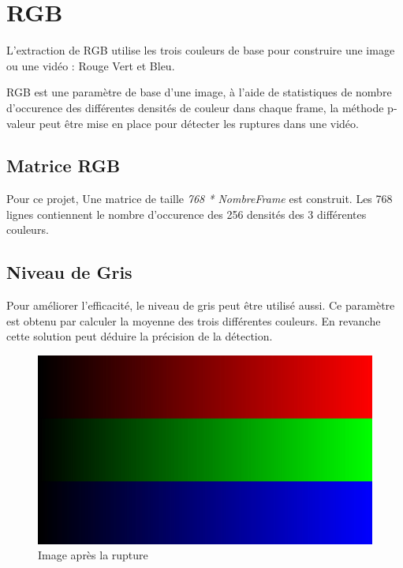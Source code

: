 \section{RGB}
L’extraction de RGB utilise les trois couleurs de base pour construire une image ou une vidéo : Rouge Vert et Bleu.

RGB est une paramètre de base d’une image, à l’aide de statistiques de nombre d’occurence des différentes densités de couleur dans chaque frame, la méthode p-valeur peut être mise en place pour détecter les ruptures dans une vidéo.

\subsection{Matrice RGB}

Pour ce projet, Une matrice de taille \textit{768 * NombreFrame} est construit. Les 768 lignes contiennent le nombre d'occurence des 256 densités des 3 différentes couleurs.

\subsection{Niveau de Gris}
Pour améliorer l’efficacité, le niveau de gris peut être utilisé aussi. Ce paramètre est obtenu par calculer la moyenne des trois différentes couleurs. En revanche cette solution peut déduire la précision de la détection.

\begin{figure}[h!]
      \centering
      \includegraphics[scale=0.12]{images/RGB.jpg}
      \caption{\label{Après} Image après la rupture}
\end{figure}


